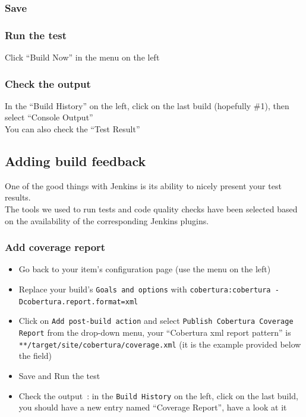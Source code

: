 \documentclass{article}
\begin{document}
\subsubsection{Save}

\subsubsection{Run the test}
Click ``Build Now'' in the menu on the left

\subsubsection{Check the output}
In the ``Build History'' on the left, click on the last build (hopefully \#1), then select ``Console Output'' \\
You can also check the ``Test Result''

\subsection{Adding build feedback}
One of the good things with Jenkins is its ability to nicely present your test results. \\
The tools we used to run tests and code quality checks have been selected based on the availability of the corresponding Jenkins plugins.

\subsubsection{Add coverage report}
\begin{itemize}
\item Go back to your item's configuration page (use the menu on the left)
\item Replace your build's \texttt{Goals and options} with \texttt{cobertura:cobertura -Dcobertura.report.format=xml}
\item Click on \texttt{Add post-build action} and select \texttt{Publish Cobertura Coverage Report} from the drop-down menu, your ``Cobertura xml report pattern'' is \texttt{**/target/site/cobertura/coverage.xml} (it is the example provided below the field)
\item Save and Run the test
\item Check the output~: in the \texttt{Build History} on the left, click on the last build, you should have a new entry named ``Coverage Report'', have a look at it
\end{itemize}
\end{document}
